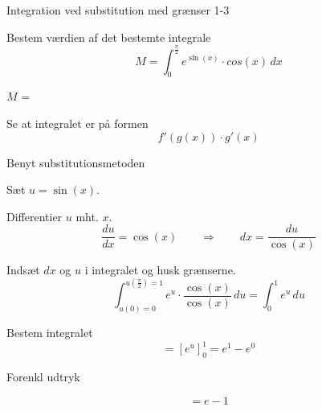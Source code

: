 \documentclass{article}
\begin{document}
\begin{exercise}{Integration ved substitution med grænser 1-3}
	
	
	Bestem værdien af det bestemte integrale
	\[
	M = \int_0^{\frac{\pi}{2}} e^{\sin(x)} \cdot cos(x) \, dx
	\]

	$M$ =  \\
	
	
	
	\hint
	
	Se at integralet er på formen
	\[
	f'(g(x)) \cdot g'(x)
	\]
	
	\hint
	
	Benyt substitutionsmetoden
	
	\hint
	
	Sæt $u=\sin(x)$.
	
	
	\hint
	
	Differentier $u$ mht. $x$.
	\[
	\frac{du}{dx} = \cos(x) \qquad	\Rightarrow \qquad dx = \frac{du}{\cos(x)}
	\]
	
	\hint
	
	Indsæt $dx$ og $u$ i integralet og husk grænserne.
	\[
	\int_{u(0)=0}^{u(\frac{\pi}{2}) = 1} e^{u} \cdot \frac{\cos(x)}{\cos(x)} \, du = \int_0^1 e^u \, du
	\]
	
	\hint
	
	Bestem integralet
	\[
	=  \left[e^u\right]_0^1 = e^1-e^0
	\]
	
	\hint
	
	Forenkl udtryk
	
	\hint
	
	\[
	= e - 1
	\]
	
	
\end{exercise}

\newpage
\end{document}
